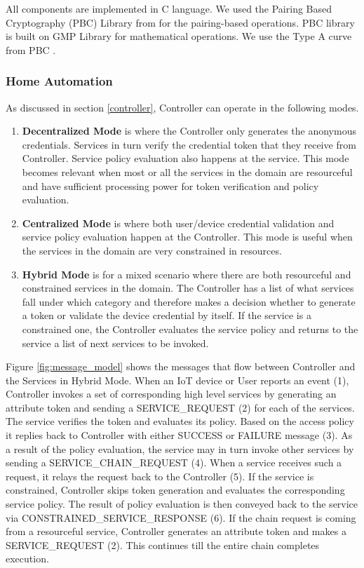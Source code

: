\documentclass[journal]{IEEEtran}
\begin{document}
All components are implemented in C language. We used the Pairing Based Cryptography (PBC) Library from \cite{pbc} for the pairing-based operations. PBC library is built on GMP Library \cite{gmp} for  mathematical operations. We use the Type A curve from PBC \cite{curve}.

\subsubsection{Home Automation}
As discussed in section \ref{controller}, Controller can operate in the following modes.
\begin{enumerate}[label=\alph*)]
	\item \textbf{Decentralized Mode} is where the Controller only generates the anonymous credentials. Services in turn verify the credential token that they receive from Controller. Service policy evaluation also happens at the service. This mode becomes relevant when most or all the services in the domain are resourceful and have sufficient processing power for token verification and policy evaluation. 
	\item \textbf{Centralized Mode} is where both user/device credential validation and service policy evaluation happen at the Controller. This mode is useful when the services in the domain are very constrained in resources.
	\item \textbf{Hybrid Mode} is for a mixed scenario where there are both resourceful and constrained services in the domain. The Controller has a list of what services fall under which category and therefore makes a decision whether to generate a token or validate the device credential by itself. If the service is a constrained one, the Controller evaluates the service policy and returns to the service a list of next services to be invoked.
\end{enumerate}

Figure \ref{fig:message_model} shows the messages that flow between Controller and the Services in Hybrid Mode. When an IoT device or User reports an event (1), Controller invokes a set of corresponding high level services by generating an attribute token and sending a SERVICE\_REQUEST (2) for each of the services. The service verifies the token and evaluates its policy. Based on the access policy it replies back to Controller with either SUCCESS or FAILURE message (3). As a result of the policy evaluation, the service may in turn invoke other services by sending a SERVICE\_CHAIN\_REQUEST (4). When a service receives such a request, it relays the request back to the Controller (5). If the service is constrained, Controller skips token generation and evaluates the corresponding service policy. The result of policy evaluation is then conveyed back to the service via CONSTRAINED\_SERVICE\_RESPONSE (6). If the chain request is coming from a resourceful service, Controller generates an attribute token and makes a SERVICE\_REQUEST (2). This continues till the entire chain completes execution.
\end{document}
